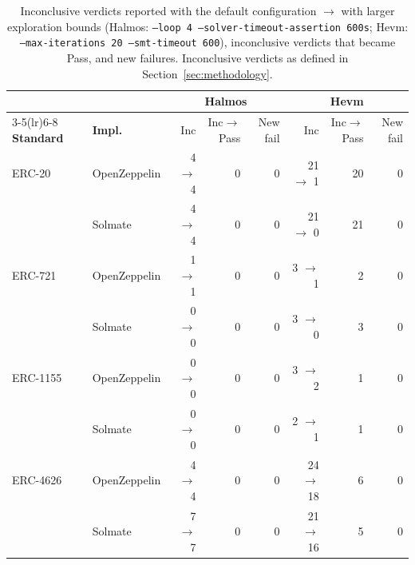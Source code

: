 \begin{table}[htbp]
\centering
\begin{scriptsize}
\begin{tabular}{llrrrrrr}
\toprule
 & & \multicolumn{3}{c}{\textbf{Halmos}} & \multicolumn{3}{c}{\textbf{Hevm}} \\
\cmidrule(lr){3-5}\cmidrule(lr){6-8}
\textbf{Standard} & \textbf{Impl.} & Inc & Inc$\rightarrow$Pass & New fail & Inc & Inc$\rightarrow$Pass & New fail \\
\midrule
ERC-20 & OpenZeppelin & 4 $\rightarrow$ 4 & 0 & 0 & 21 $\rightarrow$ 1 & 20 & 0 \\
 & Solmate & 4 $\rightarrow$ 4 & 0 & 0 & 21 $\rightarrow$ 0 & 21 & 0 \\
\addlinespace
ERC-721 & OpenZeppelin & 1 $\rightarrow$ 1 & 0 & 0 & 3 $\rightarrow$ 1 & 2 & 0 \\
 & Solmate & 0 $\rightarrow$ 0 & 0 & 0 & 3 $\rightarrow$ 0 & 3 & 0 \\
\addlinespace
ERC-1155 & OpenZeppelin & 0 $\rightarrow$ 0 & 0 & 0 & 3 $\rightarrow$ 2 & 1 & 0 \\
 & Solmate & 0 $\rightarrow$ 0 & 0 & 0 & 2 $\rightarrow$ 1 & 1 & 0 \\
\addlinespace
ERC-4626 & OpenZeppelin & 4 $\rightarrow$ 4 & 0 & 0 & 24 $\rightarrow$ 18 & 6 & 0 \\
 & Solmate & 7 $\rightarrow$ 7 & 0 & 0 & 21 $\rightarrow$ 16 & 5 & 0 \\
\bottomrule
\end{tabular}
\end{scriptsize}
\caption{Inconclusive verdicts reported with the default configuration $\rightarrow$ with larger exploration bounds (Halmos: \texttt{--loop 4 --solver-timeout-assertion 600s}; Hevm: \texttt{--max-iterations 20 --smt-timeout 600}), inconclusive verdicts that became Pass, and new failures. Inconclusive verdicts as defined in Section~\ref{sec:methodology}.}
\label{tab:sensitivity}
\end{table}
